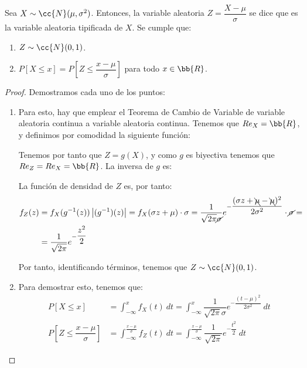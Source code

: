 \begin{teo}
    Sea $X\sim \cc{N}(\mu,\sigma^2)$. Entonces, la variable aleatoria $Z = \dfrac{X-\mu}{\sigma}$ se dice que es la variable aleatoria tipificada de $X$.
    Se cumple que:
    \begin{enumerate}
        \item $Z\sim \cc{N}(0,1)$.
        \item $P[X\leq x] = P\left[Z\leq \dfrac{x-\mu}{\sigma}\right]$ para todo $x\in \bb{R}$.
    \end{enumerate}
\end{teo}
\begin{proof}
    Demostramos cada uno de los puntos:
    \begin{enumerate}
        \item Para esto, hay que emplear el Teorema de Cambio de Variable de
        variable aleatoria continua a variable aleatoria continua. Tenemos que $Re_X = \bb{R}$, y definimos por comodidad la siguiente función:

        Tenemos por tanto que $Z=g(X)$, y como $g$ es biyectiva tenemos que $Re_Z = Re_X = \bb{R}$.
        La inversa de $g$ es:

        La función de densidad de $Z$ es, por tanto:
        \begin{align*}
            f_Z(z) &= f_X(g^{-1}(z))\left|(g^{-1})(z)\right| = f_X(\sigma z + \mu)\cdot \sigma = \dfrac{1}{\sqrt{2\pi}\cancel{\sigma}}e^{-\dfrac{(\sigma z+\bcancel{\mu} -\bcancel{\mu})^2}{2\sigma^2}} \cdot \cancel{\sigma} =\\&= \dfrac{1}{\sqrt{2\pi}}e^{-\dfrac{z^2}{2}}
        \end{align*}

        Por tanto, identificando términos, tenemos que $Z\sim \cc{N}(0,1)$.

        \item Para demostrar esto, tenemos que:
        \begin{align*}
            P[X\leq x] &= \int_{-\infty}^{x} f_X(t)~dt = \int_{-\infty}^{x} \dfrac{1}{\sqrt{2\pi}\sigma} e^{-\dfrac{(t-\mu)^2}{2\sigma^2}}~dt \\
            P\left[Z\leq \dfrac{x-\mu}{\sigma}\right] &= \int_{-\infty}^{\frac{x-\mu}{\sigma}} f_Z(t)~dt = \int_{-\infty}^{\frac{x-\mu}{\sigma}} \dfrac{1}{\sqrt{2\pi}} e^{-\dfrac{t^2}{2}}~dt
        \end{align*}


\end{enumerate}
\end{proof}
